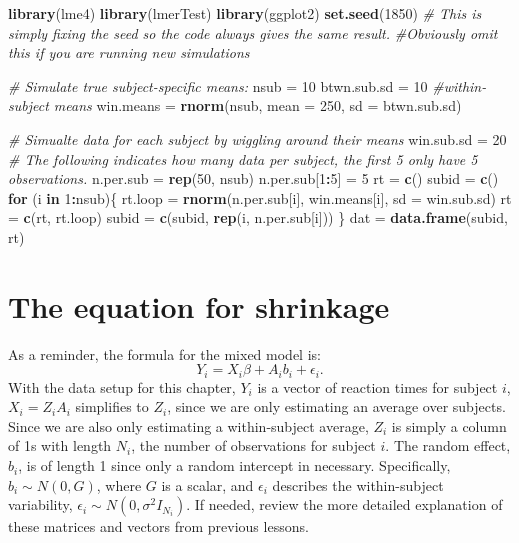 \documentclass[
]{book}
\newenvironment{Shaded}{\begin{snugshade}}{\end{snugshade}}
\newcommand{\CommentTok}[1]{\textcolor[rgb]{0.56,0.35,0.01}{\textit{#1}}}
\newcommand{\ControlFlowTok}[1]{\textcolor[rgb]{0.13,0.29,0.53}{\textbf{#1}}}
\newcommand{\DataTypeTok}[1]{\textcolor[rgb]{0.13,0.29,0.53}{#1}}
\newcommand{\DecValTok}[1]{\textcolor[rgb]{0.00,0.00,0.81}{#1}}
\newcommand{\KeywordTok}[1]{\textcolor[rgb]{0.13,0.29,0.53}{\textbf{#1}}}
\newcommand{\NormalTok}[1]{#1}
\newcommand{\OperatorTok}[1]{\textcolor[rgb]{0.81,0.36,0.00}{\textbf{#1}}}
\newcommand{\StringTok}[1]{\textcolor[rgb]{0.31,0.60,0.02}{#1}}
\begin{document}
\begin{Shaded}
\begin{Highlighting}[]
\KeywordTok{library}\NormalTok{(lme4)}
\KeywordTok{library}\NormalTok{(lmerTest)}
\KeywordTok{library}\NormalTok{(ggplot2)}
\KeywordTok{set.seed}\NormalTok{(}\DecValTok{1850}\NormalTok{)  }\CommentTok{\# This is simply fixing the seed so the code always gives the same result.  }
\CommentTok{\#Obviously omit this if you are running new simulations}

\CommentTok{\# Simulate true subject{-}specific means:}
\NormalTok{nsub =}\StringTok{ }\DecValTok{10}
\NormalTok{btwn.sub.sd =}\StringTok{ }\DecValTok{10}
\CommentTok{\#within{-}subject means}
\NormalTok{win.means =}\StringTok{ }\KeywordTok{rnorm}\NormalTok{(nsub, }\DataTypeTok{mean =} \DecValTok{250}\NormalTok{, }\DataTypeTok{sd =}\NormalTok{ btwn.sub.sd)}

\CommentTok{\# Simualte data for each subject by wiggling around their means}
\NormalTok{win.sub.sd =}\StringTok{ }\DecValTok{20}
\CommentTok{\# The following indicates how many data per subject, the first 5 only have 5 observations.}
\NormalTok{n.per.sub =}\StringTok{ }\KeywordTok{rep}\NormalTok{(}\DecValTok{50}\NormalTok{, nsub)}
\NormalTok{n.per.sub[}\DecValTok{1}\OperatorTok{:}\DecValTok{5}\NormalTok{] =}\StringTok{ }\DecValTok{5}
\NormalTok{rt =}\StringTok{ }\KeywordTok{c}\NormalTok{()}
\NormalTok{subid =}\StringTok{ }\KeywordTok{c}\NormalTok{()}
\ControlFlowTok{for}\NormalTok{ (i }\ControlFlowTok{in} \DecValTok{1}\OperatorTok{:}\NormalTok{nsub)\{}
\NormalTok{  rt.loop =}\StringTok{ }\KeywordTok{rnorm}\NormalTok{(n.per.sub[i], win.means[i], }\DataTypeTok{sd =}\NormalTok{ win.sub.sd)}
\NormalTok{  rt =}\StringTok{ }\KeywordTok{c}\NormalTok{(rt, rt.loop)}
\NormalTok{  subid =}\StringTok{ }\KeywordTok{c}\NormalTok{(subid, }\KeywordTok{rep}\NormalTok{(i, n.per.sub[i]))}
\NormalTok{\}}
\NormalTok{dat =}\StringTok{ }\KeywordTok{data.frame}\NormalTok{(subid, rt)}
\end{Highlighting}
\end{Shaded}

\hypertarget{the-equation-for-shrinkage}{%
\section{The equation for shrinkage}\label{the-equation-for-shrinkage}}

As a reminder, the formula for the mixed model is: \[Y_i = X_i\beta + A_ib_i + \epsilon_i. \] With the data setup for this chapter, \(Y_i\) is a vector of reaction times for subject \(i\), \(X_i = Z_iA_i\) simplifies to \(Z_i\), since we are only estimating an average over subjects. Since we are also only estimating a within-subject average, \(Z_i\) is simply a column of 1s with length \(N_i\), the number of observations for subject \(i\). The random effect, \(b_i\), is of length 1 since only a random intercept in necessary. Specifically, \(b_i\sim N(0, G)\), where \(G\) is a scalar, and \(\epsilon_i\) describes the within-subject variability, \(\epsilon_i \sim N(0, \sigma^2I_{N_i})\). If needed, review the more detailed explanation of these matrices and vectors from previous lessons.
\end{document}
